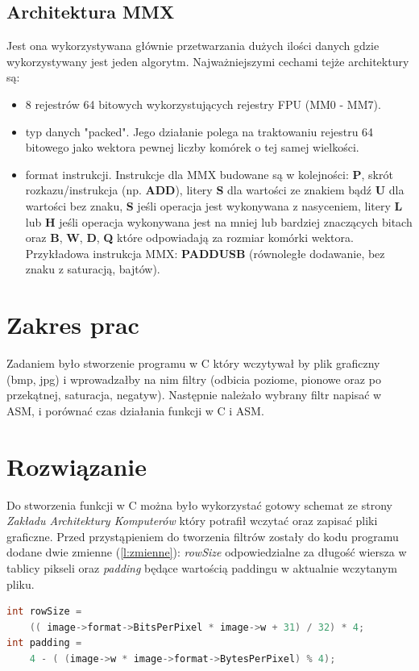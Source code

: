 {\subsection{Architektura MMX}
Jest ona wykorzystywana głównie przetwarzania dużych ilości danych gdzie wykorzystywany jest jeden algorytm. Najważniejszymi cechami tejże architektury są\cite{userguide}:
\begin{itemize}
\item 8 rejestrów 64 bitowych wykorzystujących rejestry FPU (MM0 - MM7).
\item typ danych "packed". Jego działanie polega na traktowaniu rejestru 64 bitowego jako wektora pewnej liczby komórek o tej samej wielkości.
\item format instrukcji. Instrukcje dla MMX budowane są w kolejności: \textbf{P}, skrót rozkazu/instrukcja (np. \textbf{ADD}), litery \textbf{S} dla wartości ze znakiem bądź \textbf{U} dla wartości bez znaku, \textbf{S} jeśli operacja jest wykonywana z nasyceniem, litery \textbf{L} lub \textbf{H} jeśli operacja wykonywana jest na mniej lub bardziej znaczących bitach oraz \textbf{B}, \textbf{W}, \textbf{D}, \textbf{Q} które odpowiadają za rozmiar komórki wektora. Przykładowa instrukcja MMX: \textbf{PADDUSB} (równoległe dodawanie, bez znaku z saturacją, bajtów).
\end{itemize}
\section{Zakres prac}
Zadaniem było stworzenie programu w C który wczytywał by plik graficzny (bmp, jpg) i wprowadzałby na nim filtry (odbicia poziome, pionowe oraz po przekątnej, saturacja, negatyw). Następnie należało wybrany filtr napisać w ASM, i porównać czas działania funkcji w C i ASM.
\section{Rozwiązanie}
Do stworzenia funkcji w C można było wykorzystać gotowy schemat ze strony \textit{Zakładu Architektury Komputerów}\cite{zak} który potrafił wczytać oraz zapisać pliki graficzne. Przed przystąpieniem do tworzenia filtrów zostały do kodu programu dodane dwie zmienne (\ref{l:zmienne}): \textit{rowSize} odpowiedzialne za długość wiersza w tablicy pikseli oraz \textit{padding} będące wartością paddingu w aktualnie wczytanym pliku. 

\begin{lstlisting}[language=C, frame=single, caption=Dodatkowe zmienne , label=l:zmienne, basicstyle=\small]  
int rowSize = 
	(( image->format->BitsPerPixel * image->w + 31) / 32) * 4;
int padding = 
	4 - ( (image->w * image->format->BytesPerPixel) % 4);
\end{lstlisting}

}
